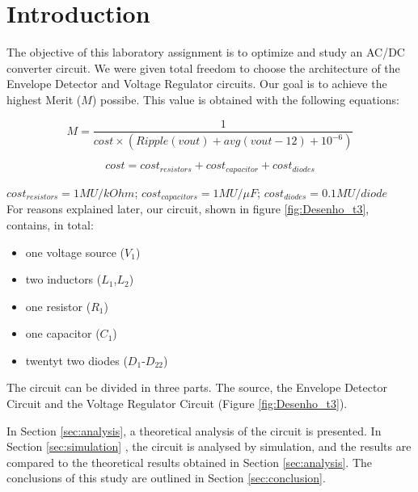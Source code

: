 
\section{Introduction}
\label{sec:introduction}



The objective of this laboratory assignment is to optimize and study an AC/DC converter
circuit. We were given total freedom to choose the architecture of the Envelope Detector
and Voltage Regulator circuits. Our goal is to achieve the highest Merit ($M$) possibe. This
value is obtained with the following equations:
	
\[
M = \frac{1}{cost\times (Ripple(vout) + avg(vout-12) + 10^{-6})}
\]

\[
 cost = cost_{resistors} + cost_{capacitor} + cost_{diodes} 
\]

$cost_{resistors} = 1MU/kOhm$; $cost_{capacitors} = 1MU/\mu F$;
$cost_{diodes} = 0.1MU/diode$ \\

For reasons explained later, our circuit, shown in figure \ref{fig:Desenho_t3}, contains,
in total:

\begin{itemize}
	\item one voltage source ($V_1$)
	\item two inductors ($L_1$,$L_2$)
	\item one resistor ($R_1$)
	\item one capacitor ($C_1$)
	\item twentyt two diodes ($D_1$-$D_{22}$)
\end{itemize}

The circuit can be divided in three parts. The source, the Envelope Detector Circuit and the
Voltage Regulator Circuit (Figure \ref{fig:Desenho_t3}).

In Section \ref{sec:analysis}, a theoretical analysis of the circuit is presented. In
Section \ref{sec:simulation} , the circuit is analysed by simulation, and the results are
compared to the theoretical results obtained in Section \ref{sec:analysis}. The conclusions
of this study are outlined in Section \ref{sec:conclusion}.


